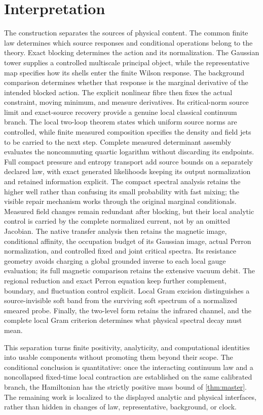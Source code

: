 \documentclass[11pt,oneside,openany]{book}
\theoremstyle{definition}
\theoremstyle{remark}
\begin{document}
\section{Interpretation}
The construction separates the sources of physical content. The common
finite law determines which source responses and conditional operations
belong to the theory. Exact blocking determines the action and its
normalization. The Gaussian tower supplies a controlled multiscale
principal object, while the representative map specifies how its shells
enter the finite Wilson response. The background comparison determines
whether that response is the marginal derivative of the intended
blocked action. The explicit nonlinear fibre then fixes the actual
constraint, moving minimum, and measure derivatives. Its critical-norm
source limit and exact-source recovery provide a genuine local
classical continuum branch. The local two-loop theorem states which
uniform source norms are controlled, while finite measured composition
specifies the density and field jets to be carried to the next step.
Complete measured determinant assembly evaluates the noncommuting
quartic logarithm without discarding its endpoints. Full compact
pressure and entropy transport add source bounds on a separately
declared law, with exact generated likelihoods keeping its output
normalization and retained information explicit.
The compact spectral analysis retains the higher well rather than
confusing its small probability with fast mixing; the visible repair
mechanism works through the original marginal conditionals. Measured field changes remain redundant after blocking,
but their local analytic control is carried by the complete normalized
current, not by an omitted Jacobian. The native transfer analysis then retains the magnetic image,
conditional affinity, the occupation budget of its Gaussian image,
actual Perron normalization, and controlled fixed and joint critical
spectra. Its resistance geometry avoids
charging a global grounded inverse to each local gauge evaluation;
its full magnetic comparison retains the extensive vacuum debit.
The regional reduction and exact Perron equation keep further
complement, boundary, and fluctuation control explicit. Local Gram
excision distinguishes a source-invisible soft band from the
surviving soft spectrum of a normalized smeared probe. Finally,
the two-level form retains the infrared channel, and the complete
local Gram criterion determines what physical spectral decay must mean.

This separation turns finite positivity, analyticity, and computational
identities into usable components without promoting them beyond their
scope. The conditional conclusion is quantitative: once the interacting
continuum law and a noncollapsed fixed-time local contraction are
established on the same calibrated branch, the Hamiltonian has the
strictly positive mass bound of \cref{thm:master}. The remaining work is
localized to the displayed analytic and physical interfaces, rather than
hidden in changes of law, representative, background, or clock.
\end{document}
